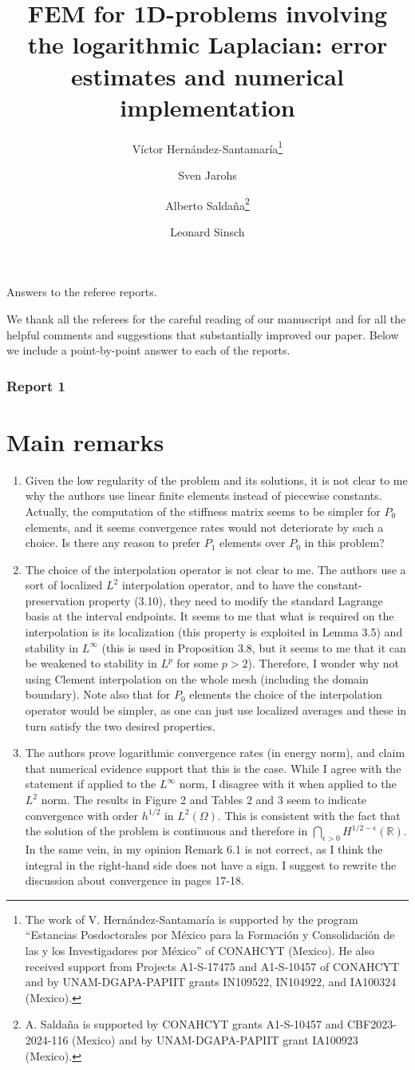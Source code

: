\documentclass[11 pt]{article}
\title{FEM for 1D-problems involving the logarithmic Laplacian: error estimates and numerical implementation}
\author{V\'ictor Hern\'andez-Santamar\'ia\footnote{The work of V. Hern\'andez-Santamar\'ia is supported by the program ``Estancias Posdoctorales por México para la Formación y Consolidación de las y los Investigadores por México'' of CONAHCYT (Mexico). He also received support from Projects A1-S-17475 and A1-S-10457 of CONAHCYT and by UNAM-DGAPA-PAPIIT grants IN109522, IN104922, and IA100324 (Mexico).} \and
 Sven Jarohs
 \and
Alberto Salda\~{n}a\footnote{ A. Saldaña is supported  by  
CONAHCYT grants A1-S-10457 and  CBF2023-2024-116 (Mexico) and by UNAM-DGAPA-PAPIIT grant IA100923 (Mexico).}\and
Leonard Sinsch
}
\date{}
\numberwithin{equation}{section}
\begin{document}
\begin{center}
 Answers to the referee reports.
\end{center}

We thank all the referees for the careful reading of our manuscript and for all the helpful comments and suggestions that substantially improved our paper. Below we include a point-by-point answer to each of the reports.


\subsubsection*{Report 1}


\section*{Main remarks}

\begin{enumerate}
    \item Given the low regularity of the problem and its solutions, it is not clear to me why the authors use linear finite elements instead of piecewise constants. Actually, the computation of the stiffness matrix seems to be simpler for \(P_{0}\) elements, and it seems convergence rates would not deteriorate by such a choice. Is there any reason to prefer \(P_{1}\) elements over \(P_{0}\) in this problem?

    \item The choice of the interpolation operator is not clear to me. The authors use a sort of localized \(L^{2}\) interpolation operator, and to have the constant-preservation property (3.10), they need to modify the standard Lagrange basis at the interval endpoints. It seems to me that what is required on the interpolation is its localization (this property is exploited in Lemma 3.5) and stability in \(L^{\infty}\) (this is used in Proposition 3.8, but it seems to me that it can be weakened to stability in \(L^{p}\) for some \(p>2\)). Therefore, I wonder why not using Clement interpolation on the whole mesh (including the domain boundary). Note also that for \(P_{0}\) elements the choice of the interpolation operator would be simpler, as one can just use localized averages and these in turn satisfy the two desired properties.

    \item The authors prove logarithmic convergence rates (in energy norm), and claim that numerical evidence support that this is the case. While I agree with the statement if applied to the \(L^{\infty}\) norm, I disagree with it when applied to the \(L^{2}\) norm. The results in Figure 2 and Tables 2 and 3 seem to indicate convergence with order \(h^{1/2}\) in \(L^{2}(\Omega)\). This is consistent with the fact that the solution of the problem is continuous and therefore in \(\bigcap_{\epsilon>0}H^{1/2-\epsilon}(\mathbb{R})\). In the same vein, in my opinion Remark 6.1 is not correct, as I think the integral in the right-hand side does not have a sign. I suggest to rewrite the discussion about convergence in pages 17-18.
\end{enumerate}
\end{document}
